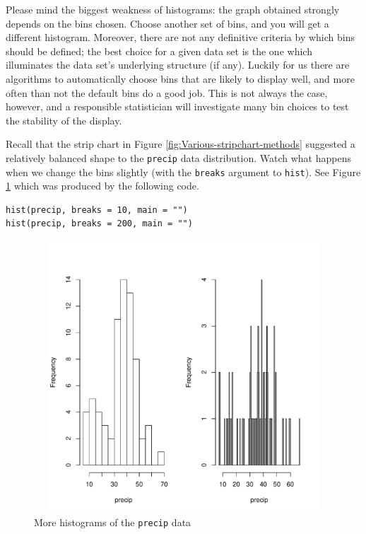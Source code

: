\documentclass[captions=tableheading]{scrbook}
\begin{document}
Please mind the biggest weakness of histograms: the graph obtained strongly depends on the bins chosen. Choose another set of bins, and you will get a different histogram. Moreover, there are not any definitive criteria by which bins should be defined; the best choice for a given data set is the one which illuminates the data set's underlying structure (if any). Luckily for us there are algorithms to automatically choose bins that are likely to display well, and more often than not the default bins do a good job. This is not always the case, however, and a responsible statistician will investigate many bin choices to test the stability of the display.

\begin{example}
Recall that the strip chart in Figure \ref{fig:Various-stripchart-methods} suggested a relatively balanced shape to the \texttt{precip} data distribution. Watch what happens when we change the bins slightly (with the \texttt{breaks} argument to \texttt{hist}). See Figure \ref{fig:histograms-bins} which was produced by the following code.



\begin{verbatim}
hist(precip, breaks = 10, main = "")
hist(precip, breaks = 200, main = "")
\end{verbatim}





\begin{figure}[th]
    \includegraphics[width=5in, height=4in]{img/histograms-bins.pdf}
    \caption{More histograms of the \texttt{precip} data}
    \label{fig:histograms-bins}
  \end{figure}


\end{example}
\end{document}
